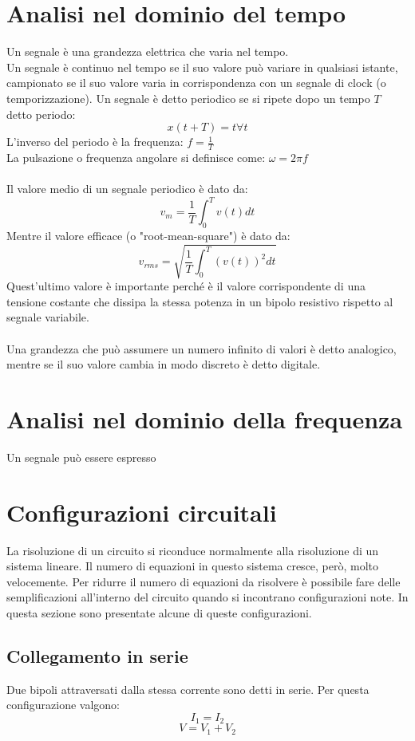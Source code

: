 \documentclass{article}
\begin{document}
\section{Analisi nel dominio del tempo}
Un segnale è una grandezza elettrica che varia nel tempo.\\
Un segnale è continuo nel tempo se il suo valore può variare in qualsiasi istante, campionato se il suo valore varia in corrispondenza con un segnale di clock (o temporizzazione).
Un segnale è detto periodico se si ripete dopo un tempo $T$ detto periodo:
$$ x(t+T)=t \forall t $$
L'inverso del periodo è la frequenza: $f=\frac{1}{T}$\\
La pulsazione o frequenza angolare si definisce come: $\omega=2\pi f$\\\\
Il valore medio di un segnale periodico è dato da:
$$ v_m=\frac{1}{T}\int_0^Tv(t)dt $$
Mentre il valore efficace (o "root-mean-square") è dato da:
$$ v_{rms} = \sqrt{\frac{1}{T}\int_0^T(v(t))^2dt}$$
Quest'ultimo valore è importante perché è il valore corrispondente di una tensione costante che dissipa la stessa potenza in un bipolo resistivo rispetto al segnale variabile.\\\\
Una grandezza che può assumere un numero infinito di valori è detto analogico, mentre se il suo valore cambia in modo discreto è detto digitale.

\section{Analisi nel dominio della frequenza}
Un segnale può essere espresso 





\newpage
\section{Configurazioni circuitali}
La risoluzione di un circuito si riconduce normalmente alla risoluzione di un sistema lineare. Il numero di equazioni in questo sistema cresce, però, molto velocemente. Per ridurre il numero di equazioni da risolvere è possibile fare delle semplificazioni all'interno del circuito quando si incontrano configurazioni note. In questa sezione sono presentate alcune di queste configurazioni.

\subsection{Collegamento in serie}
Due bipoli attraversati dalla stessa corrente sono detti in serie.
Per questa configurazione valgono:
$$ I_1=I_2 $$
$$ V=V_1+V_2 $$
\end{document}
